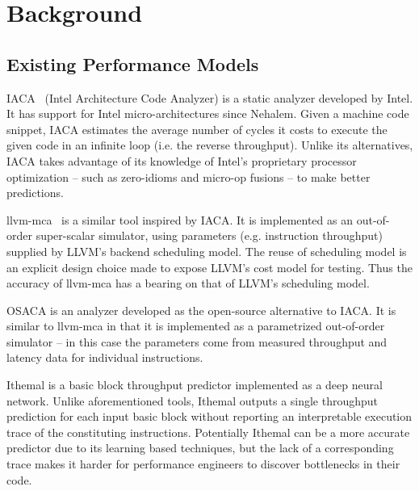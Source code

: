\section{Background}

\subsection{Existing Performance Models}
\label{sec:perf-models}

IACA~\cite{iaca} (Intel Architecture Code Analyzer) is a static analyzer
developed by Intel. It has support for Intel micro-architectures
since Nehalem.
Given a machine code snippet, IACA estimates the average number
of cycles it costs to execute the given code in an infinite 
loop (i.e. the reverse throughput).
Unlike its alternatives, IACA takes advantage of its knowledge
of Intel's proprietary processor optimization
-- such as zero-idioms and micro-op fusions -- to make better 
predictions.

llvm-mca~\cite{llvm-mca} is a similar tool inspired by IACA. 
It is implemented as an out-of-order super-scalar simulator,
using parameters (e.g. instruction throughput)
supplied by LLVM\cite{llvm}'s backend scheduling model.
The reuse of scheduling model is an explicit design choice
made to expose LLVM's cost model for testing.
Thus the accuracy of llvm-mca has a bearing on
that of LLVM's scheduling model.

OSACA\cite{osaca} is an analyzer developed as the open-source
alternative to IACA. It is similar to llvm-mca in that
it is implemented as a parametrized out-of-order simulator
-- in this case the parameters come from measured throughput
and latency data for individual instructions.

Ithemal\cite{ithemal} is a basic block throughput predictor
implemented as a deep neural network. Unlike aforementioned 
tools, Ithemal outputs a single throughput prediction for each
input basic block without reporting an interpretable execution
trace of the constituting instructions.
Potentially Ithemal can be a more accurate predictor
due to its learning based techniques, but the lack of a corresponding 
trace makes it harder for performance engineers to discover
bottlenecks in their code.

